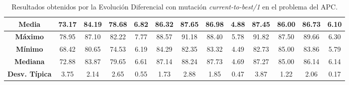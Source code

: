 \documentclass[11pt,a4paper]{article}
\begin{document}
\begin{table}[H]
{\begin{tabular}{c|c|c|c|c|c|c|c|c|c|c|c|c|}
\multicolumn{1}{|c|}{\textbf{Media}}        & 73.17                      & 84.19                   & 78.68                  & 6.82       & 86.32                      & 87.65                   & 86.98                  & 4.88       & 87.45                      & 86.00                   & 86.73                  & 6.10       \\ \hline
\multicolumn{1}{|c|}{\textbf{Máximo}}       & 78.95                      & 87.10                   & 82.22                  & 7.77       & 88.57                      & 91.18                   & 88.40                  & 5.78       & 91.82                      & 87.50                   & 89.66                  & 6.30       \\ \hline
\multicolumn{1}{|c|}{\textbf{Mínimo}}       & 68.42                      & 80.65                   & 74.53                  & 6.19       & 84.29                      & 82.35                   & 83.32                  & 4.49       & 82.73                      & 85.00                   & 83.86                  & 5.79       \\ \hline
\multicolumn{1}{|c|}{\textbf{Mediana}}      & 72.88                      & 83.87                   & 79.65                  & 6.61       & 87.14                      & 88.24                   & 87.73                  & 4.69       & 87.27                      & 85.00                   & 86.14                  & 6.14       \\ \hline
\multicolumn{1}{|c|}{\textbf{Desv. Típica}} & 3.75                       & 2.14                    & 2.65                   & 0.55       & 1.73                       & 2.88                    & 1.85                   & 0.47       & 3.87                       & 1.22                    & 2.06                   & 0.17       \\ \hline
\end{tabular}
}%
\caption{Resultados obtenidos por la Evolución Diferencial con mutación \textit{current-to-best/1} en el problema del APC.}
\end{table}
\end{document}
